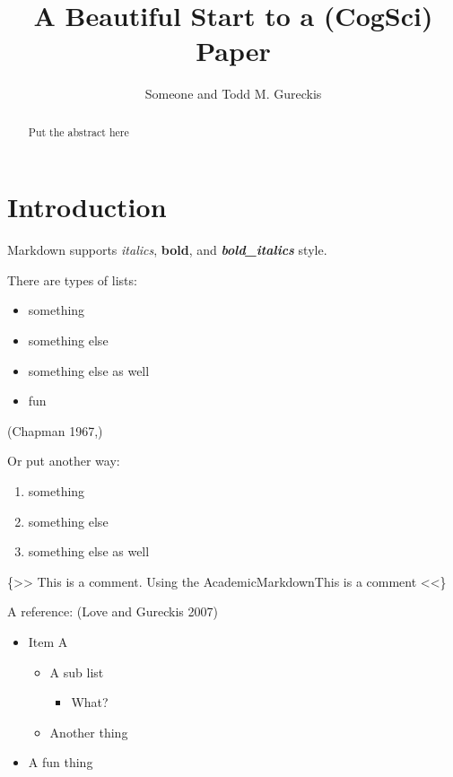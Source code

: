 \documentclass[
]{article}
\title{A Beautiful Start to a (CogSci) Paper}
\author{Someone and Todd M. Gureckis}
\date{}
\providecommand{\tightlist}{%
  \setlength{\itemsep}{0pt}\setlength{\parskip}{0pt}}
\begin{document}
\maketitle
\begin{abstract}
Put the abstract here
\end{abstract}

\hypertarget{introduction}{%
\section{Introduction}\label{introduction}}

Markdown supports \emph{italics}, \textbf{bold}, and
\textbf{\emph{bold\_italics}} style.

There are types of lists:

\begin{itemize}
\tightlist
\item
  something\\
\item
  something else\\
\item
  something else as well\\
\item
  fun
\end{itemize}

(Chapman 1967,)

Or put another way:

\begin{enumerate}
\def\labelenumi{\arabic{enumi}.}
\tightlist
\item
  something\\
\item
  something else\\
\item
  something else as well
\end{enumerate}

\{\textgreater{}\textgreater{} This is a comment. Using the
AcademicMarkdownThis is a comment \textless{}\textless{}\}

A reference: (Love and Gureckis 2007)

\begin{itemize}
\tightlist
\item
  Item A

  \begin{itemize}
  \tightlist
  \item
    A sub list

    \begin{itemize}
    \tightlist
    \item
      What?
    \end{itemize}
  \item
    Another thing
  \end{itemize}
\item
  A fun thing
\end{itemize}
\end{document}
